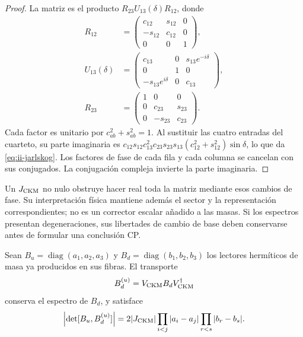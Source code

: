 \begin{proof}
La matriz es el producto \(R_{23}U_{13}(\delta)R_{12}\), donde
\begin{equation}
\begin{aligned}
 R_{12}&=\begin{pmatrix}c_{12}&s_{12}&0\\-s_{12}&c_{12}&0\\0&0&1\end{pmatrix},
 \\
 U_{13}(\delta)&=
 \begin{pmatrix}c_{13}&0&s_{13}e^{-i\delta}\\0&1&0\\
 -s_{13}e^{i\delta}&0&c_{13}\end{pmatrix},
 \\
 R_{23}&=\begin{pmatrix}1&0&0\\0&c_{23}&s_{23}\\0&-s_{23}&c_{23}\end{pmatrix}.
\end{aligned}
 \label{eq:ii-ckm-factorization}
\end{equation}
Cada factor es unitario por \(c_{ab}^2+s_{ab}^2=1\).
Al sustituir las cuatro entradas del cuarteto, su parte imaginaria es
\(c_{12}s_{12}c_{13}^2c_{23}s_{23}s_{13}
(c_{12}^2+s_{12}^2)\sin\delta\), lo que da
\eqref{eq:ii-jarlskog}. Los factores de fase de cada fila y cada columna
se cancelan con sus conjugados. La conjugación compleja invierte la parte
imaginaria.
\end{proof}

Un \(J_{\rm CKM}\) no nulo obstruye hacer real toda la matriz mediante
esos cambios de fase. Su interpretación física mantiene además el sector
y la representación correspondientes; no es un corrector escalar añadido
a las masas. Si los espectros presentan degeneraciones, sus libertades de
cambio de base deben conservarse antes de formular una conclusión CP.



\begin{samepage}
\begin{proposition}
Sean \(B_u=\operatorname{diag}(a_1,a_2,a_3)\) y
\(B_d=\operatorname{diag}(b_1,b_2,b_3)\) los lectores hermíticos de masa
ya producidos en sus fibras. El transporte
\begin{equation}
 B_d^{(u)}=V_{\rm CKM}B_dV_{\rm CKM}^{\dagger}
 \label{eq:ii-ckm-mass-transport}
\end{equation}
conserva el espectro de \(B_d\), y satisface
\begin{equation}
 \left|\det[B_u,B_d^{(u)}]\right|
 =2|J_{\rm CKM}|
   \prod_{i<j}|a_i-a_j|\prod_{r<s}|b_r-b_s|.
 \label{eq:ii-ckm-commutator}
\end{equation}
\end{proposition}
\end{samepage}

